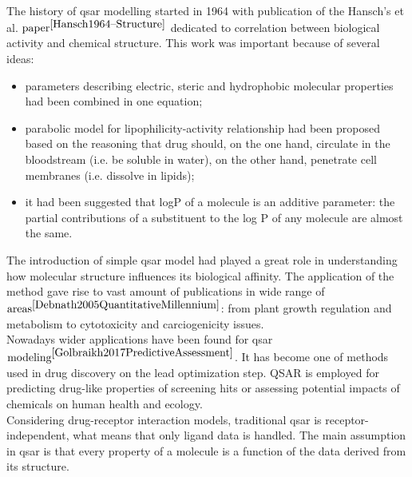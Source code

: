 The history of \acrshort{qsar} modelling started in 1964 with publication of the Hansch's et al. $\text{paper}^{\cite{Hansch1964--Structure}}$ dedicated to correlation between biological activity and chemical structure.
This work was important because of several ideas:
\begin{itemize}

    \item  parameters describing electric, steric and hydrophobic molecular properties had been combined in one equation;
    \item parabolic model for lipophilicity-activity relationship had been proposed based on the reasoning that drug should, on the one hand, circulate in the bloodstream (i.e. be soluble in water), on the other hand, penetrate cell membranes (i.e. dissolve in lipids); 
    \item it had been suggested that logP of a molecule is an additive parameter: the partial contributions of a substituent to the log P of any molecule are almost the same.
\end{itemize}

The introduction of simple \acrshort{qsar} model had played a great role in understanding how molecular structure influences its biological affinity.
The application of the method gave rise to vast amount of publications in wide range of $\text{areas}^{\cite{Debnath2005QuantitativeMillennium}}$: from plant growth regulation and metabolism to cytotoxicity and carciogenicity issues.\\

Nowadays wider applications have been found for \acrshort{qsar} $\text{modeling}^{\cite{Golbraikh2017PredictiveAssessment}}$.
It has become one of methods used in drug discovery on the lead optimization step.
QSAR is employed for predicting drug-like properties of screening hits or assessing potential impacts of chemicals on human health and ecology.
 \\

Considering drug-receptor interaction models, traditional \acrshort{qsar} is receptor-independent, what means that only ligand data is handled.
The main assumption in \acrshort{qsar} is that every property of a molecule is a function of the data derived from its structure.
\hfill\break\\
